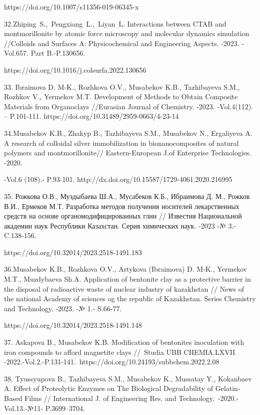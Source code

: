 https://doi.org/10.1007/s11356-019-06345-x

32.Zhiping~S.,~Pengxiang~L.,~Liyan~L. Interactions between CTAB and
montmorillonite by atomic force microscopy and molecular dynamics
simulation //Colloids and Surfaces A: Physicochemical and Engineering
Aspects. -2023. -Vol.657. Part B.-P.130656.

https://doi.org/10.1016/j.colsurfa.2022.130656

33. Ibraimova D. M-K., Rozhkova O.V., Musabekov K.B., Tazhibayeva S.M.,
Rozhkov V., Yermekov M.T. Development of Methods to Obtain Composite
Materials from Organoclays //Eurasian Journal of Chemistry. -2023.
-Vol.4(112). -- P.101-111. https://doi.org/10.31489/2959-0663/4-23-14

34.Musabekov K.B., Zhakyp B., Tazhibayeva S.M., Musabekov N., Ergaliyeva
A. A research of colloidal silver immobilization in bionanocomposites of
natural polymers and montmorillonite// Eastern-European J.of Enterprise
Technologies. -2020.

-Vol.6 (108).- P.93-101.
http://dx.doi.org/10.15587/1729-4061.2020.216995

35. Рожкова О.В., Муздыбаева Ш.А., Мусабеков К.Б., Ибраимова Д. М.,
Рожков В.И., Ермеков М.Т. Разработка методов получения носителей
лекарственных средств на основе органомодифицированных глин // Известия
Национальной академии наук Республики Казахстан. Серия химических наук.
-2023 -№ 3.- C.138-156.

https://doi.org/10.32014/2023.2518-1491.183

36.Musabekov K.B., Rozhkova O.V., Artykova (Ibraimova) D. M-K., Yermekov
M.T., Muzdybaeva Sh.A. Application of bentonite clay as a protective
barrier in the disposal of radioactive waste of nuclear industry of
kazakhstan // News of the national Academy of sciences og the republic
of Kazakhstan. Series Chemistry and Technology. -2023. -№ 1.- S.66-77.

https://doi.org/10.32014/2023.2518-1491.148

37. Askapova B., Musabekov K.B. Modification of bentonites inoculation
with iron compounds to afford magnetite clays //~Studia UBB CHEMIA.LXVII
-2022.-Vol.2.-P.131-141.~https://doi.org/10.24193/subbchem.2022.2.08

38. Tyussyupova B., Tazhibayeva S.M., Musabekov K., Mussatay Y.,
Kokanbaev A. Effect of Proteolytic Enzymes on The Biological
Degradability of Gelatin-Based Films // International J. of Engineering
Res. and Technology.~-2020.-Vol.13.-№11- P.3699--3704.

